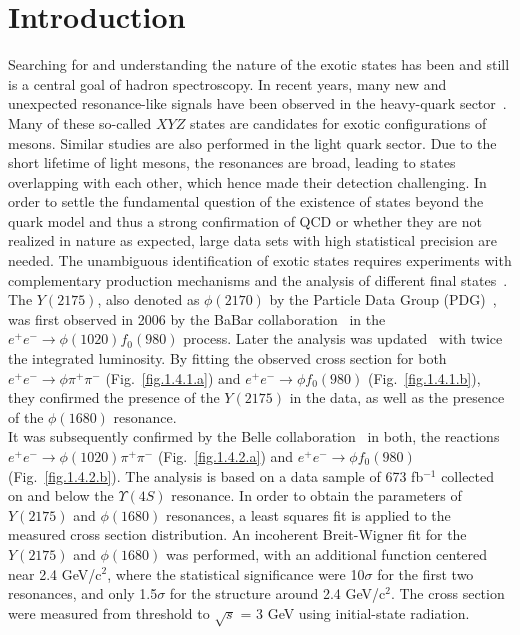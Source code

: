 \section{Introduction}
\label{sec.intro}

Searching for and understanding the nature of the exotic states has been and still is a central goal of hadron spectroscopy. In recent years, many new and unexpected resonance-like signals have been observed in the heavy-quark sector~\cite{Tanabashi18}. Many of these so-called $XYZ$ states are candidates for exotic configurations of mesons. Similar studies are also performed in the light quark sector. Due to the short lifetime of light mesons, the resonances are broad, leading to states overlapping with each other, which hence made their detection challenging. In order to settle the fundamental question of the existence of states beyond the quark model and thus a strong confirmation of QCD or whether they are not realized in nature as expected, large data sets with high statistical precision are needed. The unambiguous identification of exotic states requires experiments with complementary production mechanisms and the analysis of different final states~\cite{Szczepaniak01}.\\
The $Y(2175)$, also denoted as $\phi(2170)$ by the Particle Data Group (PDG)~\cite{Tanabashi18}, was first observed in 2006 by the BaBar collaboration~\cite{Aubert06} in the $e^{+}e^{-}\rightarrow \phi(1020)f_0(980)$ process. Later the analysis was updated~\cite{Aubert12} with twice the integrated luminosity. By fitting the observed cross section for both $e^{+}e^{-}\rightarrow \phi \pi^{+} \pi^{-}$ (Fig.~\ref{fig.1.4.1.a}) and $e^{+}e^{-}\rightarrow \phi f_0(980)$ (Fig.~\ref{fig.1.4.1.b}), they confirmed the presence of the $Y(2175)$ in the data, as well as the presence of the $\phi(1680)$ resonance.\\
It was subsequently confirmed by the Belle collaboration~\cite{Shen09} in both, the reactions $e^{+}e^{-}\rightarrow \phi(1020)\pi^{+}\pi^{-}$ (Fig.~\ref{fig.1.4.2.a}) and $e^{+}e^{-}\rightarrow \phi f_0(980)$ (Fig.~\ref{fig.1.4.2.b}). The analysis is based on a data sample of 673 fb$^{-1}$ collected on and below the $\Upsilon(4S)$ resonance. In order to obtain the parameters of $Y(2175)$ and $\phi(1680)$ resonances, a least squares fit is applied to the measured cross section distribution. An incoherent Breit-Wigner fit for the $Y(2175)$ and $\phi(1680)$ was performed, with an additional function centered near 2.4 GeV/c$^2$, where the statistical significance were 10$\sigma$ for the first two resonances, and only 1.5$\sigma$ for the structure around 2.4 GeV/c$^2$. The cross section were measured from threshold to $\sqrt{s}$ = 3 GeV using initial-state radiation.\\
